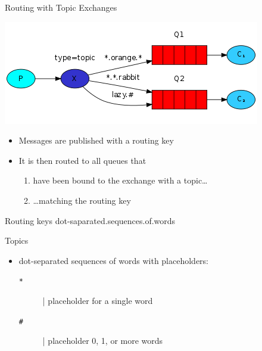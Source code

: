 \documentclass{beamer}\mode<presentation>{\usetheme{AMSBolognaFC}}
\begin{document}
\begin{frame}[allowframebreaks]{Routing with Topic Exchanges}

    \begin{center}
        \includegraphics[width=.5\linewidth]{img/routing.png}
    \end{center}

    \bigskip

    \begin{itemize}
        \item Messages are published with a \alert{routing key}

        \medskip

        \item It is then routed to all queues that
        \begin{enumerate}
            \item have been bound to the exchange with a \alert{topic}\ldots
            \item \ldots \alert{matching} the routing key
        \end{enumerate}
    \end{itemize}

    \framebreak

    \begin{block}{Routing keys}\ttfamily\centering
        dot-saparated.sequences.of.words
    \end{block}

    \bigskip

    \begin{block}{Topics}
        \begin{itemize}
            \item dot-separated sequences of words with placeholders:
            \begin{description}
                \item[\texttt{*}] | placeholder for a single word
                \item[\texttt{\#}] | placeholder 0, 1, or more words
            \end{description}
        \end{itemize}
    \end{block}

\end{frame}
\end{document}
